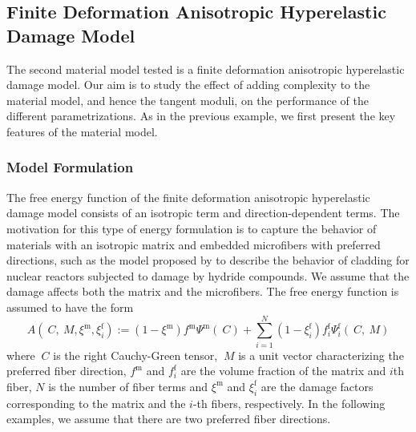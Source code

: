 \documentclass[12pt]{article}
\newcommand{\mtrx}{{\text{m}}}
\newcommand{\fiber}{{\text{f}}}
\numberwithin{equation}{section}
\begin{document}
\subsection{Finite Deformation Anisotropic Hyperelastic Damage Model}
\label{subsec:anisotropic}

The second material model tested is a finite deformation anisotropic
hyperelastic damage model. Our aim is to study the effect of adding
complexity to the material model, and hence the tangent moduli, on the
performance of the different parametrizations. As in the previous
example, we first present the key features of the material model.

\subsubsection{Model Formulation}

The free energy function of the finite deformation anisotropic
hyperelastic damage model consists of an isotropic term and
direction-dependent terms. The motivation for this type of energy
formulation is to capture the behavior of materials with an isotropic
matrix and embedded microfibers with preferred directions, such as the
model proposed by \citet{Chen.etal:2014} to describe the behavior of
cladding for nuclear reactors subjected to damage by hydride
compounds. We assume that the damage affects both the matrix and the
microfibers. The free energy function is assumed to have the form
\begin{equation}\label{eq:aniso-energy}
  A(~C, ~M, \xi^\mtrx, \xi^\fiber_i)
  :=
  (1-\xi^\mtrx) f^\mtrx \Psi^\mtrx(~C)
  + \sum_{i=1}^{N} (1-\xi^\fiber_i) f^\fiber_i \Psi^\fiber_i(~C, ~M)
\end{equation}
where $~C$ is the right Cauchy-Green tensor, $~M$ is a unit vector
characterizing the preferred fiber direction, $f^\mtrx$ and
$f^\fiber_i$ are the volume fraction of the matrix and $i$th fiber,
$N$ is the number of fiber terms and $\xi^\mtrx$ and $\xi^\fiber_i$
are the damage factors corresponding to the matrix and the $i$-th
fibers, respectively. In the following examples, we assume that there
are two preferred fiber directions.
\end{document}
